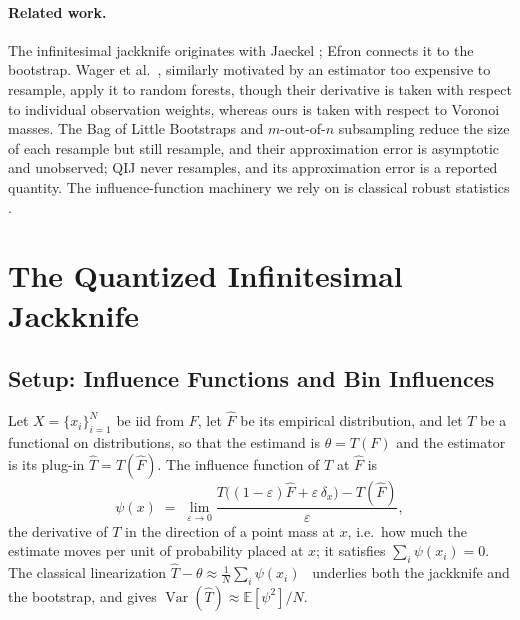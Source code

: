 \documentclass[runningheads]{llncs}
\begin{document}
\paragraph{Related work.} The infinitesimal jackknife originates with Jaeckel \cite{jaeckel1972}; Efron \cite{efron1982} connects it to the bootstrap. Wager et al.\ \cite{wager2014}, similarly motivated by an estimator too expensive to resample, apply it to random forests, though their derivative is taken with respect to individual observation weights, whereas ours is taken with respect to Voronoi masses. The Bag of Little Bootstraps \cite{kleiner2014} and $m$-out-of-$n$ subsampling \cite{bickel1997} reduce the size of each resample but still resample, and their approximation error is asymptotic and unobserved; QIJ never resamples, and its approximation error is a reported quantity. The influence-function machinery we rely on is classical robust statistics \cite{hampel1974,stefanski2002}.


\section{The Quantized Infinitesimal Jackknife}\label{sec:method}

\subsection{Setup: Influence Functions and Bin Influences}\label{sec:setup}

Let $X=\{x_i\}_{i=1}^{N}$ be iid from $F$, let $\hat{F}$ be its empirical
distribution, and let $T$ be a functional on distributions, so that the
estimand is $\theta = T(F)$ and the estimator is its plug-in
$\hat{T} = T(\hat{F})$. The influence function of $T$ at $\hat{F}$ is
%
\begin{equation}\label{eq:if}
  \psi(x) \;=\; \lim_{\varepsilon \to 0}
  \frac{T\!\big((1-\varepsilon)\hat{F} + \varepsilon\,\delta_x\big) - T(\hat{F})}
       {\varepsilon},
\end{equation}
%
the derivative of $T$ in the direction of a point mass at $x$, i.e.\ how much
the estimate moves per unit of probability placed at $x$; it satisfies
$\sum_i \psi(x_i) = 0$. The classical linearization
$\hat{T} - \theta \approx \tfrac{1}{N}\sum_i \psi(x_i)$~\cite{vonmises1947,hampel1974}
underlies both the jackknife and the bootstrap, and gives
$\operatorname{Var}(\hat{T}) \approx \mathbb{E}[\psi^2]/N$.
\end{document}
